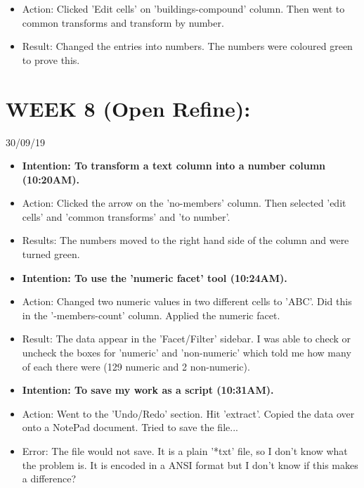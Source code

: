\documentclass[a4paper,12pt]{article}
\begin{document}
\begin{itemize}
\begin{itemize}
\item Action: Clicked 'Edit cells' on 'buildings-compound' column. Then went to common transforms and transform by number.

\item Result: Changed the entries into numbers. The numbers were coloured green to prove this. 


\end{itemize}

\section{WEEK 8 (Open Refine):}

30/09/19

\begin {itemize}

\item \textbf{Intention: To transform a text column into a number column (10:20AM).}

\item Action: Clicked the arrow on the 'no-members' column. Then selected 'edit cells' and 'common transforms' and 'to number'. 

\item Results: The numbers moved to the right hand side of the column and were turned green. 

\item \textbf {Intention: To use the 'numeric facet' tool (10:24AM).}

\item Action: Changed two numeric values in two different cells to 'ABC'. Did this in the '-members-count' column. Applied the numeric facet.

\item Result: The data appear in the 'Facet/Filter' sidebar. I was able to check or uncheck the boxes for 'numeric' and 'non-numeric' which told me how many of each there were (129 numeric and 2 non-numeric). 

\item \textbf {Intention: To save my work as a script (10:31AM).}

\item Action: Went to the 'Undo/Redo' section. Hit 'extract'. Copied the data over onto a NotePad document. Tried to save the file...

\item Error: The file would not save. It is a plain '*txt' file, so I don't know what the problem is. It is encoded in a ANSI format but I don't know if this makes a difference?


\end{itemize}
\end{itemize}
\end{document}
